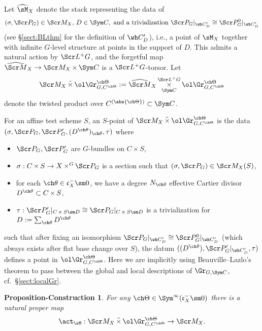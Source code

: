 \documentclass[final]{amsart}
\newtheorem{prop-const}[subsubsection]{Proposition-Construction}
\theoremstyle{remark}
\theoremstyle{definition}
\DeclareMathOperator*{\ttimes}{\tilde\times}
\DeclareMathOperator*{\xt}{\times}
\numberwithin{equation}{section}
\begin{document}
\subsubsection{}  \label{sect:Glevel}
Let $\widehat\sM_X$ denote the stack 
representing the data of 
\[ (\sigma,\Scr P_G)\in \Scr M_X,\, D\in \Sym C,
\text{ and a trivialization }\Scr P_G|_{\wh C'_D} \cong \Scr P^0_G|_{\wh C'_D}
\] 
(see \S\ref{sect:BLthm} for the definition of $\wh C'_D$), i.e., 
a point of $\sM_X$ together with infinite $G$-level structure at points in the support of $D$. 
This admits a natural action by $\Scr L^+ G$, and 
the forgetful map $\widehat{\Scr M}_X
 \to \Scr M_X \xt \Sym C$ is a $\Scr L^+G$-torsor.
Let 
\[ \Scr M_X \ttimes \ol\Gr^{\ch\Theta}_{G, C^{\ch\Theta}} := 
\widehat{\Scr M}_X \xt^{\Scr L^+ G}_{\Sym C}
\ol\Gr^{\ch\Theta}_{G,C^{\ch\Theta}} \]
denote the twisted product over $C^{(\abs{\ch\Theta})} \subset \Sym C$.

For an affine test scheme $S$, 
an $S$-point of $\Scr M_X \ttimes \ol\Gr^{\ch\Theta}_{G,C^{\ch\Theta}}$ 
is the data 
$(\sigma, \Scr P_G,\Scr P'_G, (D^{\ch\theta})_{\ch\theta}, \tau)$
where 
\begin{itemize}
\item $\Scr P_G,\Scr P_G'$ are $G$-bundles on $C\xt S$,
\item $\sigma : C\xt S \to X\xt^G \Scr P_G$ is a section such that $(\sigma,\Scr P_G)\in \Scr M_X(S)$,
\item for each $\ch\theta \in \mathfrak c_X^- \sm 0$,  
we have a degree $N_{\ch\theta}$ effective Cartier divisor 
$D^{\ch\theta} \subset C\xt S$, 
\item $\tau : \Scr P'_G|_{C\xt S\sm D} \cong \Scr P_G|_{C\xt S\sm D}$
is a trivialization for $D:=\sum_{\ch\theta} D^{\ch\theta}$
\end{itemize}
such that after fixing an isomorphism 
$\Scr P_G|_{\wh C'_D} \cong \Scr P^0_G|_{\wh C'_D}$ (which always exists
after flat base change over $S$), the datum
$((D^{\ch\theta}),\Scr P'_G|_{\wh C'_D},\tau)$ defines
a point in $\ol\Gr^{\ch\Theta}_{G,C^{\ch\Theta}}$.
Here we are implicitly using Beauville--Lazlo's theorem to pass between
the global and local descriptions of $\Gr_{G,\Sym C}$, 
cf.~\S\ref{sect:localGr}.


\begin{prop-const}
\label{prop-const:action}
For any $\ch\Theta \in \Sym^\infty(\mathfrak c_X^-\sm 0)$
there is a natural proper map 
\[ \act_\sM : \Scr M_X \ttimes \ol\Gr^{\ch\Theta}_{G, C^{\ch\Theta}} \to 
\Scr M_X. \]
\end{prop-const}
\end{document}
